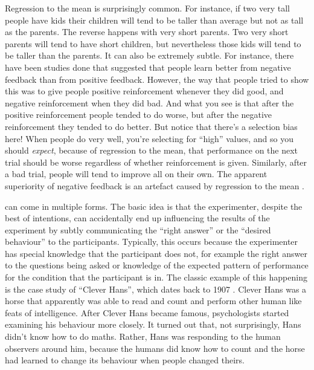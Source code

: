 Regression to the mean is surprisingly common. For instance, if two very tall people have kids their children will tend to be taller than average but not as tall as the parents. The reverse happens with very short parents. Two very short parents will tend to have short children, but nevertheless those kids will tend to be taller than the parents. It can also be extremely subtle. For instance, there have been studies done that suggested that people learn better from negative feedback than from positive feedback. However, the way that people tried to show this was to give people positive reinforcement whenever they did good, and negative reinforcement when they did bad. And what you see is that after the positive reinforcement people tended to do worse, but after the negative reinforcement they tended to do better. But notice that there's a selection bias here! When people do very well, you're selecting for ``high'' values, and so you should {\it expect}, because of regression to the mean, that performance on the next trial should be worse regardless of whether reinforcement is given. Similarly, after a bad trial, people will tend to improve all on their own. The apparent superiority of negative feedback is an artefact caused by regression to the mean \parencite[see][for discussion]{Kahneman1973}.


 can come in multiple forms. The basic idea is that the experimenter, despite the best of intentions, can accidentally end up influencing the results of the experiment by subtly communicating the ``right answer'' or the ``desired behaviour'' to the participants. Typically, this occurs because the experimenter has special knowledge that the participant does not, for example the right answer to the questions being asked or knowledge of the expected pattern of performance for the condition that the participant is in. The classic example of this happening is the case study of ``Clever Hans'', which dates back to 1907 \parencite{Pfungst1911,Hothersall2004}. Clever Hans was a horse that apparently was able to read and count and perform other human like feats of intelligence. After Clever Hans became famous, psychologists started examining his behaviour more closely. It turned out that, not surprisingly, Hans didn't know how to do maths. Rather, Hans was responding to the human observers around him, because the humans did know how to count and the horse had learned to change its behaviour when people changed theirs. 

